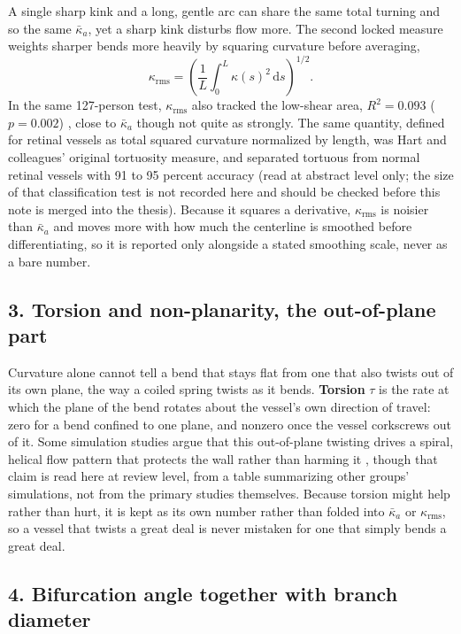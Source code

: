 A single sharp kink and a long, gentle arc can share the same total turning and so the same
$\bar\kappa_a$, yet a sharp kink disturbs flow more. The second locked measure weights sharper bends
more heavily by squaring curvature before averaging,
\begin{equation}
  \kappa_{\mathrm{rms}} = \left(\frac{1}{L}\int_0^L \kappa(s)^2\,\mathrm{d}s\right)^{1/2} .
  \label{eq:kappa-rms}
\end{equation}
In the same 127-person test, $\kappa_{\mathrm{rms}}$ also tracked the low-shear area,
$R^2 = 0.093$ ($p = 0.002$) \cite{kashyap2022tortuosity}, close to $\bar\kappa_a$ though not quite
as strongly. The same quantity, defined for retinal vessels as total squared curvature normalized
by length, was Hart and colleagues' original tortuosity measure, and separated tortuous from normal
retinal vessels with 91 to 95 percent accuracy \cite{hart1999tortuosity} (read at abstract level
only; the size of that classification test is not recorded here and should be checked before this
note is merged into the thesis). Because it squares a derivative, $\kappa_{\mathrm{rms}}$ is noisier
than $\bar\kappa_a$ and moves more with how much the centerline is smoothed before differentiating,
so it is reported only alongside a stated smoothing scale, never as a bare number.

\subsection*{3. Torsion and non-planarity, the out-of-plane part}

Curvature alone cannot tell a bend that stays flat from one that also twists out of its own plane,
the way a coiled spring twists as it bends. \textbf{Torsion} $\tau$ is the rate at which the plane
of the bend rotates about the vessel's own direction of travel: zero for a bend confined to one
plane, and nonzero once the vessel corkscrews out of it. Some simulation studies argue that this
out-of-plane twisting drives a spiral, helical flow pattern that protects the wall rather than
harming it \cite{shen2026geometry}, though that claim is read here at review level, from a table
summarizing other groups' simulations, not from the primary studies themselves. Because torsion
might help rather than hurt, it is kept as its own number rather than folded into $\bar\kappa_a$ or
$\kappa_{\mathrm{rms}}$, so a vessel that twists a great deal is never mistaken for one that simply
bends a great deal.

\subsection*{4. Bifurcation angle together with branch diameter}

